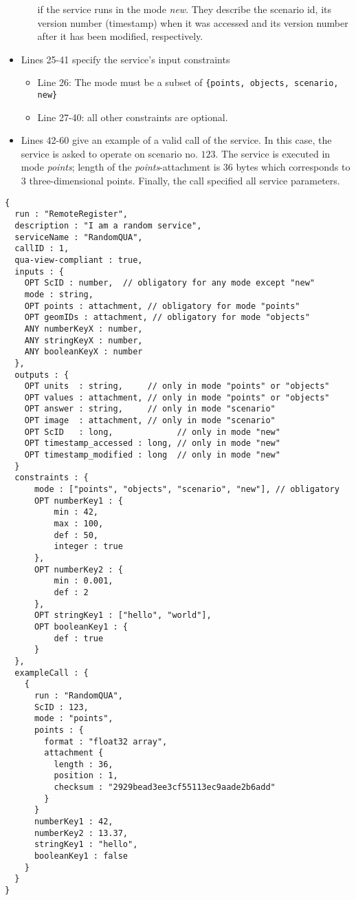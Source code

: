 \begin{itemize}
\begin{itemize}
            if the service runs in the mode \emph{new}.
            They describe the scenario id, its version number (timestamp) when it was accessed and
            its version number after it has been modified, respectively.
    \end{itemize}
  \item Lines 25-41 specify the service's input constraints
    \begin{itemize}
      \item Line 26: The mode must be a subset of \texttt{\{points, objects, scenario, new\}}
      \item Line 27-40: all other constraints are optional.
    \end{itemize}
  \item Lines 42-60 give an example of a valid call of the service.
       In this case, the service is asked to operate on scenario no. $123$.
       The service is executed in mode \emph{points};
       length of the \emph{points}-attachment is 36 bytes which corresponds to 3 three-dimensional points.
       Finally, the call specified all service parameters.
\end{itemize}

\newpage

\begin{lstlisting}[caption={Registering a QUA-compliant service}, label={lst:quacompliance}]
{
  run : "RemoteRegister",
  description : "I am a random service",
  serviceName : "RandomQUA",
  callID : 1,
  qua-view-compliant : true,
  inputs : {
    OPT ScID : number,  // obligatory for any mode except "new"
    mode : string,
    OPT points : attachment, // obligatory for mode "points"
    OPT geomIDs : attachment, // obligatory for mode "objects"
    ANY numberKeyX : number,
    ANY stringKeyX : number,
    ANY booleanKeyX : number
  },
  outputs : {
    OPT units  : string,     // only in mode "points" or "objects"
    OPT values : attachment, // only in mode "points" or "objects"
    OPT answer : string,     // only in mode "scenario"
    OPT image  : attachment, // only in mode "scenario"
    OPT ScID   : long,             // only in mode "new"
    OPT timestamp_accessed : long, // only in mode "new"
    OPT timestamp_modified : long  // only in mode "new"
  }
  constraints : {
      mode : ["points", "objects", "scenario", "new"], // obligatory
      OPT numberKey1 : {
          min : 42,
          max : 100,
          def : 50,
          integer : true
      },
      OPT numberKey2 : {
          min : 0.001,
          def : 2
      },
      OPT stringKey1 : ["hello", "world"],
      OPT booleanKey1 : {
          def : true      
      }
  },
  exampleCall : {
    {
      run : "RandomQUA",
      ScID : 123,
      mode : "points",
      points : {
        format : "float32 array",
        attachment {
          length : 36,
          position : 1,
          checksum : "2929bead3ee3cf55113ec9aade2b6add"
        }
      }
      numberKey1 : 42,
      numberKey2 : 13.37,
      stringKey1 : "hello",
      booleanKey1 : false
    }
  }
}
\end{lstlisting}


\clearpage
